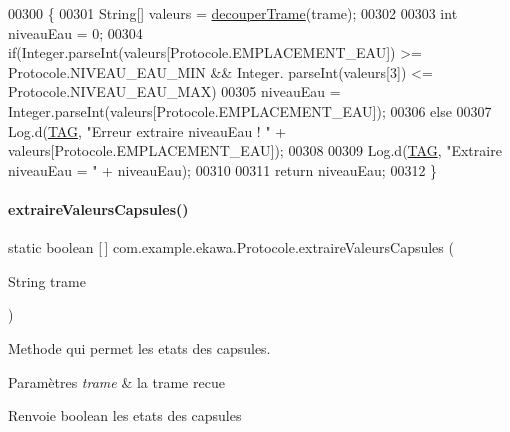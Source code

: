 \begin{DoxyCode}
00300     \{
00301         String[] valeurs = \hyperlink{classcom_1_1example_1_1ekawa_1_1_protocole_a23c261e4ab5ad3c2ac60187f04ae40ea}{decouperTrame}(trame);
00302 
00303         \textcolor{keywordtype}{int} niveauEau = 0;
00304         \textcolor{keywordflow}{if}(Integer.parseInt(valeurs[Protocole.EMPLACEMENT\_EAU]) >= Protocole.NIVEAU\_EAU\_MIN && Integer.
      parseInt(valeurs[3]) <= Protocole.NIVEAU\_EAU\_MAX)
00305             niveauEau = Integer.parseInt(valeurs[Protocole.EMPLACEMENT\_EAU]);
00306         \textcolor{keywordflow}{else}
00307             Log.d(\hyperlink{classcom_1_1example_1_1ekawa_1_1_protocole_ae9b68fa0daac528421b887f19413f8f5}{TAG}, \textcolor{stringliteral}{"Erreur extraire niveauEau ! "} + valeurs[Protocole.EMPLACEMENT\_EAU]);
00308 
00309         Log.d(\hyperlink{classcom_1_1example_1_1ekawa_1_1_protocole_ae9b68fa0daac528421b887f19413f8f5}{TAG}, \textcolor{stringliteral}{"Extraire niveauEau = "} + niveauEau);
00310 
00311         \textcolor{keywordflow}{return} niveauEau;
00312     \}
\end{DoxyCode}
\mbox{\label{classcom_1_1example_1_1ekawa_1_1_protocole_ab9ea349bfe2b76585f8e71677cacd867}} 
\paragraph{\texorpdfstring{extraire\+Valeurs\+Capsules()}{extraireValeursCapsules()}}
{\footnotesize\ttfamily static boolean \mbox{[}$\,$\mbox{]} com.\+example.\+ekawa.\+Protocole.\+extraire\+Valeurs\+Capsules (\begin{DoxyParamCaption}\item[{String}]{trame }\end{DoxyParamCaption})\hspace{0.3cm}{\ttfamily [static]}}



Methode qui permet les etats des capsules. 


\begin{DoxyParams}{Paramètres}
{\em trame} & la trame recue \\
\hline
\end{DoxyParams}
\begin{DoxyReturn}{Renvoie}
boolean les etats des capsules 
\end{DoxyReturn}


